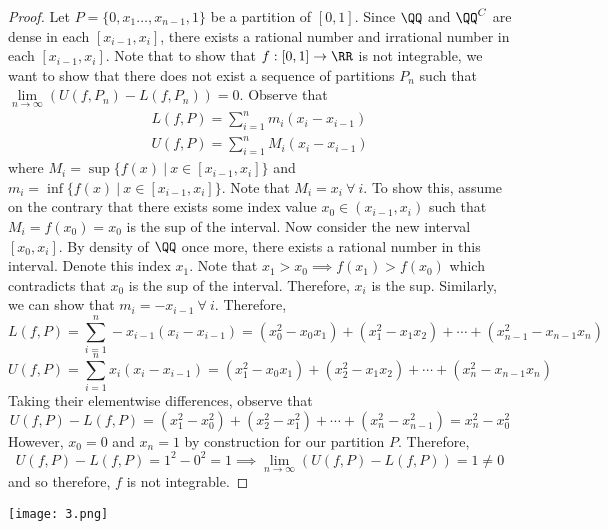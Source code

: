 \documentclass[12pt]{scrartcl}
\begin{document}
\begin{proof}

\hfill

Let $P = \{0, x_1 \ldots, x_{n-1}, 1\}$ be a partition of $[0, 1]$. Since $\QQ$ and $\QQ^C$ are dense in 
each $[x_{i-1}, x_i]$, there exists a rational number and irrational number in each $[x_{i-1}, x_i]$.
Note that to show that $f: [0, 1] \to \RR$ is not integrable, we want to show that there does not exist a sequence of partitions 
$P_n$ such that $\underset{n\to\infty}{\lim}{(U(f, P_n) - L(f, P_n)) = 0}$. Observe that 
\begin{align*}
  L(f, P) = \sum_{i=1}^n m_i(x_i - x_{i-1})\\
  U(f, P) = \sum_{i=1}^n M_i(x_i - x_{i-1})
\end{align*}
where $M_i = \sup\{f(x) \ | \ x \in [x_{i-1}, x_i]\}$ and $m_i = \inf\{f(x) \ | \ x \in [x_{i-1}, x_i]\}$.
Note that $M_i = x_i \ \forall \ i$. To show this, assume on the contrary that there exists some index value 
$x_0 \in (x_{i-1}, x_i)$ such that $M_i = f(x_0) = x_0$ is the sup of the interval. Now consider the new 
interval $[x_0, x_i]$. By density of $\QQ$ once more, there exists a rational number in this interval. Denote this index 
$x_1$. Note that $x_1 > x_0 \implies f(x_1) > f(x_0)$ which contradicts that $x_0$ is the sup of the interval. Therefore, 
$x_i$ is the sup. Similarly, we can show that $m_i = -x_{i-1} \ \forall \ i$. Therefore,
\[L(f, P) = \sum_{i=1}^n -x_{i-1}(x_i - x_{i-1}) = (x_0^2 -x_0x_1) + (x_1^2 - x_1x_2) + \cdots + (x_{n-1}^2 - x_{n-1}x_n)\]
\[U(f, P) = \sum_{i=1}^n x_i(x_i - x_{i-1}) = (x_1^2 - x_0x_1) + (x_2^2 - x_1x_2) + \cdots + (x_n^2 - x_{n-1}x_n)\]
Taking their elementwise differences, observe that 
\[U(f, P) - L(f, P) = (x_1^2 - x_0^2) + (x_2^2 - x_1^2) + \cdots + (x_n^2 - x_{n-1}^2) = x_n^2 - x_0^2\]
However, $x_0 = 0$ and $x_n = 1$ by construction for our partition $P$. Therefore, 
\[U(f, P) - L(f, P) = 1^2 - 0^2 = 1 \implies \lim_{n\to\infty} (U(f, P) - L(f, P)) = 1 \neq 0\]
and so therefore, $f$ is not integrable.


\end{proof}
\newpage 

\texttt{[image: 3.png]}
\end{document}
